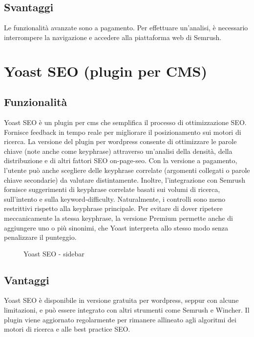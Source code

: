 \subsection{Svantaggi}
\par Le funzionalità avanzate sono a pagamento. Per effettuare un'analisi, è necessario interrompere la navigazione e accedere alla piattaforma web di Semrush.

\section{Yoast SEO (plugin per CMS)}

\subsection{Funzionalità}
\par Yoast SEO è un plugin per \gls{cms} che semplifica il processo di ottimizzazione SEO. Fornisce feedback in tempo reale per migliorare il posizionamento sui motori di ricerca. La versione del plugin per \gls{wordpress} consente di ottimizzare le parole chiave (note anche come keyphrase) attraverso un'analisi della densità, della distribuzione e di altri fattori SEO \gls{on-page-seo}. Con la versione a pagamento, l'utente può anche scegliere delle keyphrase correlate (argomenti collegati o parole chiave secondarie) da valutare distintamente. Inoltre, l'integrazione con Semrush fornisce suggerimenti di keyphrase correlate basati sui volumi di ricerca, sull'intento e sulla \gls{keyword-difficulty}. Naturalmente, i controlli sono meno restrittivi rispetto alla keyphrase principale. Per evitare di dover ripetere meccanicamente la stessa keyphrase, la versione Premium permette anche di aggiungere uno o più sinonimi, che Yoast interpreta allo stesso modo senza penalizzare il punteggio.

\begin{figure}[H]
    \centering 
    \caption{Yoast SEO - sidebar}
\end{figure}

\subsection{Vantaggi}
\par Yoast SEO è disponibile in versione gratuita per \gls{wordpress}, seppur con alcune limitazioni, e può essere integrato con altri strumenti come Semrush e Wincher. Il plugin viene aggiornato regolarmente per rimanere allineato agli algoritmi dei motori di ricerca e alle best practice SEO.

